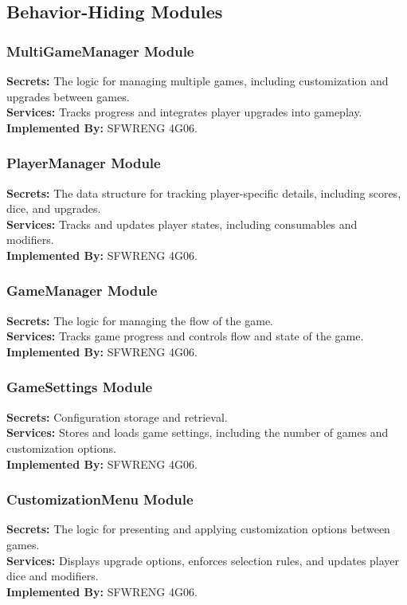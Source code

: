 \documentclass[12pt, titlepage]{article}
\begin{document}
\subsection{Behavior-Hiding Modules}
\subsubsection{MultiGameManager Module}
\textbf{Secrets:} The logic for managing multiple games, including customization and upgrades between games.\\
\textbf{Services:} Tracks progress and integrates player upgrades into gameplay.\\
\textbf{Implemented By:} SFWRENG 4G06.

\subsubsection{PlayerManager Module}
\textbf{Secrets:} The data structure for tracking player-specific details, including scores, dice, and upgrades.\\
\textbf{Services:} Tracks and updates player states, including consumables and modifiers.\\
\textbf{Implemented By:} SFWRENG 4G06.

\subsubsection{GameManager Module}
\textbf{Secrets:} The logic for managing the flow of the game.\\
\textbf{Services:} Tracks game progress and controls flow and state of the game.\\
\textbf{Implemented By:} SFWRENG 4G06.

\subsubsection{GameSettings Module}
\textbf{Secrets:} Configuration storage and retrieval.\\
\textbf{Services:} Stores and loads game settings, including the number of games and customization options.\\
\textbf{Implemented By:} SFWRENG 4G06.

\subsubsection{CustomizationMenu Module}
\textbf{Secrets:} The logic for presenting and applying customization options between games.\\
\textbf{Services:} Displays upgrade options, enforces selection rules, and updates player dice and modifiers.\\
\textbf{Implemented By:} SFWRENG 4G06.
\end{document}
